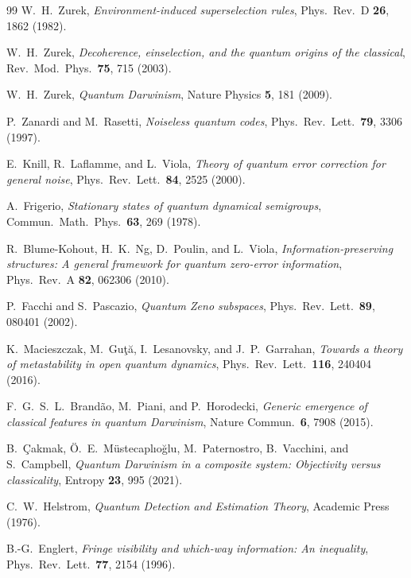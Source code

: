 \documentclass[12pt,a4paper]{article}
\begin{document}
\begin{thebibliography}{99}
W.~H.~Zurek, \emph{Environment-induced superselection rules}, Phys.\ Rev.\ D \textbf{26}, 1862 (1982).

W.~H.~Zurek, \emph{Decoherence, einselection, and the quantum origins of the classical}, Rev.\ Mod.\ Phys.\ \textbf{75}, 715 (2003).

W.~H.~Zurek, \emph{Quantum Darwinism}, Nature Physics \textbf{5}, 181 (2009).

P.~Zanardi and M.~Rasetti, \emph{Noiseless quantum codes}, Phys.\ Rev.\ Lett.\ \textbf{79}, 3306 (1997).

E.~Knill, R.~Laflamme, and L.~Viola, \emph{Theory of quantum error correction for general noise}, Phys.\ Rev.\ Lett.\ \textbf{84}, 2525 (2000).

A.~Frigerio, \emph{Stationary states of quantum dynamical semigroups}, Commun.\ Math.\ Phys.\ \textbf{63}, 269 (1978).

R.~Blume-Kohout, H.~K.~Ng, D.~Poulin, and L.~Viola, \emph{Information-preserving structures: A general framework for quantum zero-error information}, Phys.\ Rev.\ A \textbf{82}, 062306 (2010).

P.~Facchi and S.~Pascazio, \emph{Quantum Zeno subspaces}, Phys.\ Rev.\ Lett.\ \textbf{89}, 080401 (2002).

K.~Macieszczak, M.~Gu\c{t}\u{a}, I.~Lesanovsky, and J.~P.~Garrahan, \emph{Towards a theory of metastability in open quantum dynamics}, Phys.\ Rev.\ Lett.\ \textbf{116}, 240404 (2016).

F.~G.~S.~L.~Brand\~ao, M.~Piani, and P.~Horodecki, \emph{Generic emergence of classical features in quantum Darwinism}, Nature Commun.\ \textbf{6}, 7908 (2015).

B.~\c{C}akmak, \"O.~E.~M\"ustecapl\i{}o\u{g}lu, M.~Paternostro, B.~Vacchini, and S.~Campbell, \emph{Quantum Darwinism in a composite system: Objectivity versus classicality}, Entropy \textbf{23}, 995 (2021).

C.~W.~Helstrom, \emph{Quantum Detection and Estimation Theory}, Academic Press (1976).

B.-G.~Englert, \emph{Fringe visibility and which-way information: An inequality}, Phys.\ Rev.\ Lett.\ \textbf{77}, 2154 (1996).


\end{thebibliography}
\end{document}
